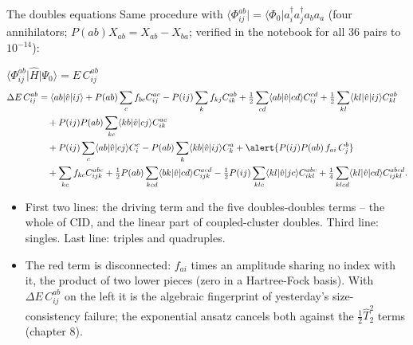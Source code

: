 \documentclass[aspectratio=169,10pt]{beamer}
\newcommand{\ket}[1]{\vert #1\rangle}
\newcommand{\bra}[1]{\langle #1\vert}
\newcommand{\element}[3]{\langle #1\vert #2\vert #3\rangle}
\begin{document}
\begin{frame}{The doubles equations}
  \footnotesize\vspace{-0.3em}
  Same procedure with $\bra{\Phi_{ij}^{ab}}=\bra{\Phi_0}a_i^{\dagger}a_j^{\dagger}a_ba_a$ (four annihilators; $P(ab)X_{ab}=X_{ab}-X_{ba}$; verified in the notebook for all $36$ pairs to $10^{-14}$):
  \begin{block}{$\bra{\Phi_{ij}^{ab}}\hat{H}\ket{\Psi_0}=E\,C_{ij}^{ab}$}
    \vspace{-1em}
    {\scriptsize
    \begin{align*}
      \Delta E\,C_{ij}^{ab}
      &=\element{ab}{\hat{v}}{ij}
      +P(ab)\sum_cf_{bc}C_{ij}^{ac}-P(ij)\sum_kf_{kj}C_{ik}^{ab}
      +\tfrac12\sum_{cd}\element{ab}{\hat{v}}{cd}C_{ij}^{cd}
      +\tfrac12\sum_{kl}\element{kl}{\hat{v}}{ij}C_{kl}^{ab}\\
      &\quad+P(ij)P(ab)\sum_{kc}\element{kb}{\hat{v}}{cj}C_{ik}^{ac}\\
      &\quad+P(ij)\sum_c\element{ab}{\hat{v}}{cj}C_i^c-P(ab)\sum_k\element{kb}{\hat{v}}{ij}C_k^a
      +\alert{P(ij)P(ab)\,f_{ai}\,C_j^b}\\
      &\quad+\sum_{kc}f_{kc}C_{ijk}^{abc}
      +\tfrac12P(ab)\sum_{kcd}\element{bk}{\hat{v}}{cd}C_{ijk}^{acd}
      -\tfrac12P(ij)\sum_{klc}\element{kl}{\hat{v}}{jc}C_{ikl}^{abc}
      +\tfrac14\sum_{klcd}\element{kl}{\hat{v}}{cd}C_{ijkl}^{abcd}.
    \end{align*}}
  \end{block}
  \begin{itemize}
    \item First two lines: the driving term and the five \alert{doubles-doubles} terms -- the whole of CID, and the linear part of coupled-cluster doubles. Third line: singles. Last line: triples and quadruples.
    \item The red term is \alert{disconnected}: $f_{ai}$ times an amplitude sharing no index with it, the product of two lower pieces (zero in a Hartree-Fock basis). With $\Delta E\,C_{ij}^{ab}$ on the left it is the algebraic fingerprint of yesterday's size-consistency failure; the exponential ansatz cancels both against the $\frac12\hat{T}_2^2$ terms (chapter 8).
  \end{itemize}
\end{frame}
\end{document}
